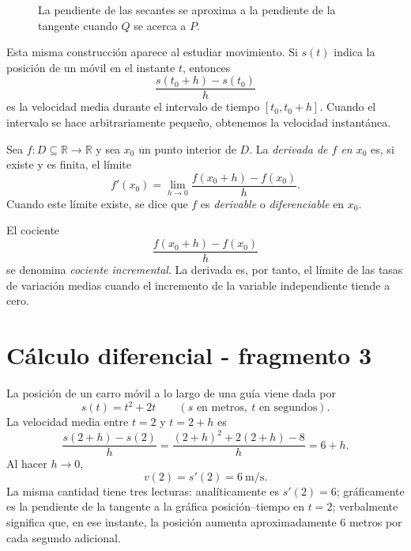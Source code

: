 \begin{figure}[htbp]
\centering
{}
\caption{La pendiente de las secantes se aproxima a la pendiente de la tangente cuando $Q$ se acerca a $P$.}

\end{figure}

Esta misma construcción aparece al estudiar movimiento. Si $s(t)$ indica la posición de un móvil en el instante $t$, entonces
\[
\frac{s(t_0+h)-s(t_0)}{h}
\]
es la velocidad media durante el intervalo de tiempo $[t_0,t_0+h]$. Cuando el intervalo se hace arbitrariamente pequeño, obtenemos la velocidad instantánea.

\begin{definition}
Sea $f:D\subseteq\mathbb{R}\to\mathbb{R}$ y sea $x_0$ un punto interior de $D$. La \emph{derivada de $f$ en $x_0$} es, si existe y es finita, el límite
\[
f'(x_0)=\lim_{h\to0}\frac{f(x_0+h)-f(x_0)}{h}.
\]
Cuando este límite existe, se dice que $f$ es \emph{derivable} o \emph{diferenciable} en $x_0$.
\end{definition}

El cociente
\[
\frac{f(x_0+h)-f(x_0)}{h}
\]
se denomina \emph{cociente incremental}. La derivada es, por tanto, el límite de las tasas de variación medias cuando el incremento de la variable independiente tiende a cero.


\section{Cálculo diferencial - fragmento 3}
\begin{example}
La posición de un carro móvil a lo largo de una guía viene dada por
\[
s(t)=t^2+2t\qquad (s\text{ en metros},\ t\text{ en segundos}).
\]
La velocidad media entre $t=2$ y $t=2+h$ es
\[
\frac{s(2+h)-s(2)}{h}
=
\frac{(2+h)^2+2(2+h)-8}{h}
=
6+h.
\]
Al hacer $h\to0$,
\[
v(2)=s'(2)=6\ \mathrm{m/s}.
\]
La misma cantidad tiene tres lecturas: analíticamente es $s'(2)=6$; gráficamente es la pendiente de la tangente a la gráfica posición--tiempo en $t=2$; verbalmente significa que, en ese instante, la posición aumenta aproximadamente $6$ metros por cada segundo adicional.
\end{example}


